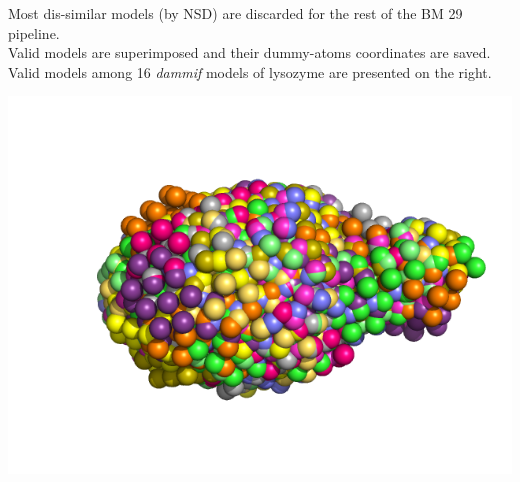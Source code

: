 \documentclass[12pt]{article}
\begin{document}
\vspace{-0.5cm}
\begin{minipage}{0.55\linewidth}
    Most dis-similar models (by NSD) are discarded for the rest of the 
    BM 29 pipeline.\\
    Valid models are superimposed and their dummy-atoms coordinates are 
    saved. 
    Valid models among 16 \textit{dammif} models of lysozyme are 
    presented on the right.
\end{minipage} \hfill
\begin{minipage}{0.4\linewidth}
    \begin{flushleft}
    \includegraphics[scale=0.3]{validmodels.png}
    \end{flushleft}
\end{minipage}


\begin{center}
\end{center}
\end{document}

